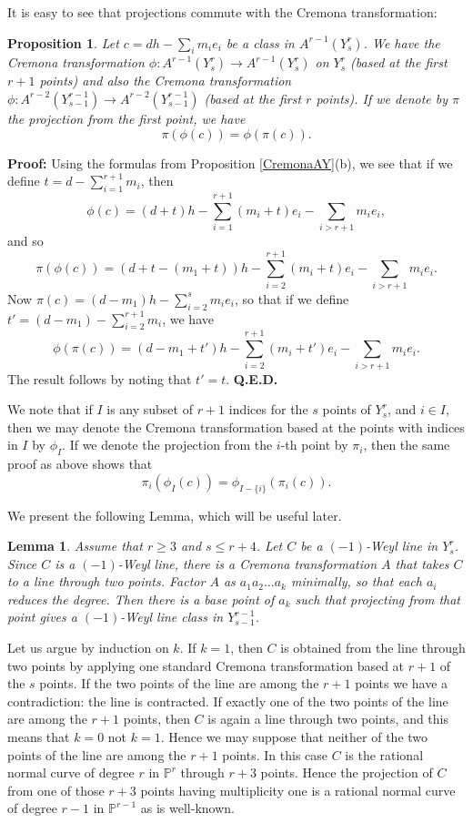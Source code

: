 \documentclass[12pt]{article}
\newtheorem{lemma}[equation]{Lemma}
\newtheorem{proposition}[equation]{Proposition}
\numberwithin{equation}{section}
\numberwithin{subeq}{equation}
\newenvironment{pf}
{\noindent\textbf{Proof: }}
{\mbox{}\hfill\textbf{ Q.E.D.}\medskip}
\def\bbP{\mathbb{P}}
\begin{document}
It is easy to see that projections commute with the Cremona transformation:
\begin{proposition}\label{Cremonaprojectioncommuteprop}
Let $c=dh-\sum_im_ie_i$ be a class in $A^{r-1}(Y^r_s)$.
We have the Cremona transformation $\phi:A^{r-1}(Y^r_s) \to A^{r-1}(Y^r_s)$ 
on $Y^r_s$
(based at the first $r+1$ points)
and also the Cremona transformation 
$\phi:A^{r-2}(Y^{r-1}_{s-1}) \to A^{r-2}(Y^{r-1}_{s-1})$
(based at the first $r$ points).
If we denote by $\pi$ the projection from the first point, we have
\[
\pi(\phi(c)) = \phi(\pi(c)).
\]
\end{proposition}

\begin{pf}
Using the formulas from Proposition \ref{CremonaAY}(b),
we see that if we define $t=d-\sum_{i=1}^{r+1} m_i$,
then
\[
\phi(c) = (d+t) h - \sum_{i=1}^{r+1}(m_i+t) e_i - \sum_{i > r+1} m_i e_i,
\]
and so
\[
\pi(\phi(c)) = (d+t-(m_1+t)) h - \sum_{i=2}^{r+1} (m_i+t) e_i - \sum_{i > r+1} m_i e_i.
\]
Now $\pi(c) = (d-m_1)h - \sum_{i=2}^s m_i e_i$, so that if we define $t' = (d-m_1)-\sum_{i=2}^{r+1} m_i$,
we have
\[
\phi(\pi(c)) = (d-m_1+t')h - \sum_{i=2}^{r+1} (m_i+t') e_i - \sum_{i>r+1} m_ie_i.
\]
The result follows by noting that $t'=t$.
\end{pf}

We note that if $I$ is any subset of $r+1$ indices for the $s$ points of $Y^r_s$,
and $i \in I$,
then we may denote the Cremona transformation based at the points with indices in $I$ by $\phi_I$.
If we denote the projection from the $i$-th point by $\pi_i$,
then the same proof as above shows that
\[
\pi_i(\phi_I(c)) = \phi_{I-\{i\}}(\pi_i(c)).
\]

We present the following Lemma, which will be useful later.

\begin{lemma}\label{projection-1lemma}
Assume that $r \geq 3$ and $s \leq r+4$.
Let $C$ be a $(-1)$-Weyl line in $Y^r_s$.
Since $C$ is a $(-1)$-Weyl line, there is a Cremona transformation $A$ that takes $C$ to a line through two points.  
Factor $A$ as $a_1a_2\ldots a_k$ minimally, so that each $a_i$ reduces the degree.
Then there is a base point of $a_k$ such that projecting from that point
gives a $(-1)$-Weyl line class in $Y^{r-1}_{s-1}$.
\end{lemma}

\medskip{}
Let us argue by induction on $k$.
If $k=1$, then $C$ is obtained from the line through two points by applying one standard Cremona transformation based at $r+1$ of the $s$ points.
If the two points of the line are among the $r+1$ points we have a contradiction: the line is contracted.
If exactly one of the two points of the line are among the $r+1$ points, 
then $C$ is again a line through two points, and this means that $k=0$ not $k=1$.
Hence we may suppose that neither of the two points of the line 
are among the $r+1$ points.
In this case $C$ is the rational normal curve of degree $r$ in $\bbP^r$ through $r+3$ points.
Hence the projection of $C$ from one of those $r+3$ points having multiplicity one is a rational normal curve of degree $r-1$ in $\bbP^{r-1}$ as is well-known.
\end{document}
